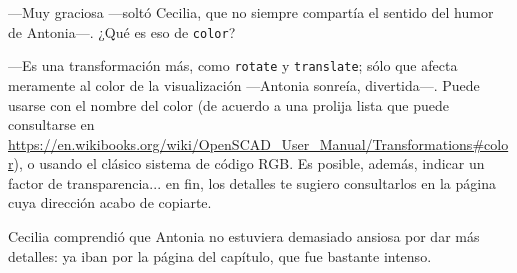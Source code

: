   
---Muy graciosa ---soltó Cecilia, que no siempre compartía el sentido
del humor de Antonia---. ¿Qué es eso de \lstinline!color!?

---Es una transformación más, como \lstinline!rotate! y
\lstinline!translate!; sólo que afecta meramente al color de la
visualización ---An\-to\-nia sonreía, divertida---. Puede usarse con el
nombre del color (de acuerdo a una prolija lista que puede consultarse
en
\url{https://en.wikibooks.org/wiki/OpenSCAD_User_Manual/Transformations\#color}),
o usando el clásico sistema de código RGB. Es posible, además, indicar
un factor de transparencia... en fin, los detalles te sugiero
consultarlos en la página cuya dirección acabo de copiarte.

Cecilia comprendió que Antonia no estuviera demasiado ansiosa por dar
más detalles: ya iban por la página
 del
capítulo, que fue bastante intenso.
\label{semicilindro-1-final}

